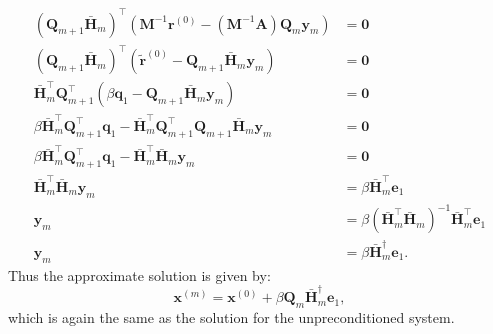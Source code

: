 \documentclass{article}
\begin{document}
\begin{appendix}
\begin{align*}
        \left( \symbf{Q}_{m+1} \bar{\symbf{H}}_m \right)^\top \left( \symbf{M}^{-1} \symbf{r}^{\left( 0 \right)} - \left( \symbf{M}^{-1} \symbf{A} \right) \symbf{Q}_m \symbf{y}_m \right) & = \symbf{0}                                                                                             \\
        \left( \symbf{Q}_{m+1} \bar{\symbf{H}}_m \right)^\top \left( \tilde{\symbf{r}}^{\left( 0 \right)} - \symbf{Q}_{m+1} \bar{\symbf{H}}_m \symbf{y}_m \right)                          & = \symbf{0}                                                                                             \\
        \bar{\symbf{H}}_m^\top \symbf{Q}_{m+1}^\top \left( \beta \symbf{q}_1 - \symbf{Q}_{m+1} \bar{\symbf{H}}_m \symbf{y}_m \right)                                                       & = \symbf{0}                                                                                             \\
        \beta \bar{\symbf{H}}_m^\top \symbf{Q}_{m+1}^\top \symbf{q}_1 - \bar{\symbf{H}}_m^\top \symbf{Q}_{m+1}^\top \symbf{Q}_{m+1} \bar{\symbf{H}}_m \symbf{y}_m                          & = \symbf{0}                                                                                             \\
        \beta \bar{\symbf{H}}_m^\top \symbf{Q}_{m+1}^\top \symbf{q}_1 - \bar{\symbf{H}}_m^\top \bar{\symbf{H}}_m \symbf{y}_m                                                               & = \symbf{0}                                                                                             \\
        \bar{\symbf{H}}_m^\top \bar{\symbf{H}}_m \symbf{y}_m                                                                                                                               & = \beta \bar{\symbf{H}}_m^\top \symbf{e}_1                                                              \\
        \symbf{y}_m                                                                                                                                                                        & = \beta \left( \bar{\symbf{H}}_m^\top \bar{\symbf{H}}_m \right)^{-1} \bar{\symbf{H}}_m^\top \symbf{e}_1 \\
        \symbf{y}_m                                                                                                                                                                        & = \beta \bar{\symbf{H}}_m^\dagger \symbf{e}_1.
    \end{align*}
    Thus the approximate solution is given by:
    \begin{equation*}
        \symbf{x}^{\left( m \right)} = \symbf{x}^{\left( 0 \right)} + \beta \symbf{Q}_m \bar{\symbf{H}}_m^\dagger \symbf{e}_1,
    \end{equation*}
    which is again the same as the solution for the unpreconditioned system.

\end{appendix}
\end{document}
